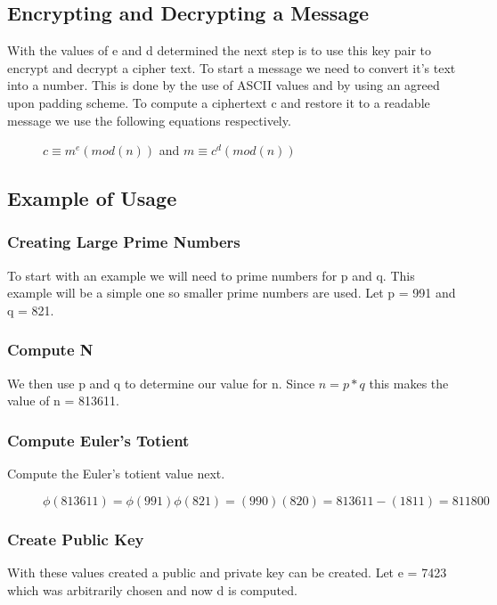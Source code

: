 \documentclass[conference]{IEEEtran}
\begin{document}
\subsection{Encrypting and Decrypting a Message}

With the values of e and d determined the next step is to use this key pair to encrypt and decrypt a cipher text. To start a message we need to convert it's text into a number. This is done by the use of ASCII values and by using an agreed upon padding scheme. To compute a ciphertext c and restore it to a readable message we use the following equations respectively.

\begin{figure}[H]
	\begin{center}
		$c\equiv {m}^{e}\left(mod\left(n\right)\right)$ and
		$m\equiv {c}^{d}\left(mod\left(n\right)\right)$
	\end{center}
\end{figure}

\subsection{Example of Usage}
\subsubsection{Creating Large Prime Numbers}
To start with an example we will need to prime numbers for p and q. This example will be a simple one so smaller prime numbers are used. Let p = 991 and q = 821.
\subsubsection{Compute N}
We then use p and q to determine our value for n. Since $n = p * q$ this makes the value of n = 813611.
\subsubsection{Compute Euler's Totient}
Compute the Euler's totient value next.
\begin{figure}[h]
	\begin{center}
$\phi \left(813611\right)=\phi \left(991\right)\phi \left(821\right)=\left(990\right)\left(820\right)=813611-\left(1811\right) = 811800$
\end{center}
\end{figure}
\subsubsection{Create Public Key}
With these values created a public and private key can be created. Let e = 7423 which was arbitrarily chosen and now d is computed.
\end{document}
